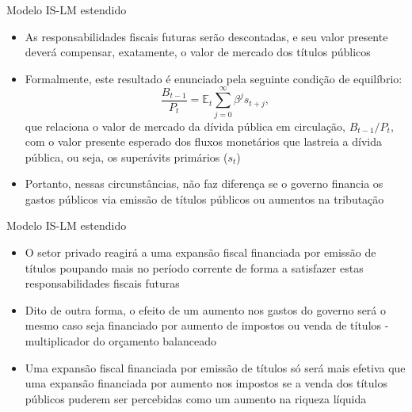 \documentclass[10pt]{beamer}
\begin{document}
\begin{frame}{Modelo IS-LM estendido}
    \begin{itemize}
        \item As responsabilidades fiscais futuras serão descontadas, e seu valor presente deverá compensar, exatamente, o valor de mercado dos títulos públicos
        \bigskip
        \item Formalmente, este resultado é enunciado pela seguinte condição de equilíbrio:
        \begin{equation}
            \frac{B_{t-1}}{P_t} = \mathbb{E}_t \sum_{j=0}^\infty \beta^j s_{t+j},
            \label{eq6}
        \end{equation}
        que relaciona o valor de mercado da dívida pública em circulação, $B_{t-1}/P_t$, com o valor presente esperado dos fluxos monetários que lastreia a dívida pública, ou seja, os superávits primários ($s_t$)
        \bigskip
        \item Portanto, nessas circunstâncias, não faz diferença se o governo financia os gastos públicos via emissão de títulos públicos ou aumentos na tributação
    \end{itemize}
\end{frame}

\begin{frame}{Modelo IS-LM estendido}
    \begin{itemize}
        \item O setor privado reagirá a uma expansão fiscal financiada por emissão de títulos poupando mais no período corrente de forma a satisfazer estas responsabilidades fiscais futuras
        \bigskip
        \item Dito de outra forma, o efeito de um aumento nos gastos do governo será o mesmo caso seja financiado por aumento de impostos ou venda de títulos - multiplicador do orçamento balanceado
        \bigskip
        \item Uma expansão fiscal financiada por emissão de títulos só será mais efetiva que uma expansão financiada por aumento nos impostos se a venda dos títulos públicos puderem ser percebidas como um aumento na riqueza líquida
    \end{itemize}
\end{frame}
\end{document}
